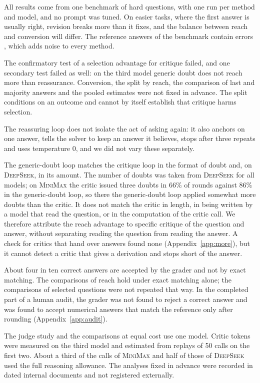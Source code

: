 \documentclass[11pt]{article}
\newcommand{\ds}{\textsc{DeepSeek}}
\newcommand{\mm}{\textsc{MiniMax}}
\begin{document}
All results come from one benchmark of hard questions, with one run per method and model, and no prompt was tuned.
On easier tasks, where the first answer is usually right, revision breaks more than it fixes, and the balance between reach and conversion will differ.
The reference answers of the benchmark contain errors \citep{zhai2026hleverified}, which adds noise to every method.

The confirmatory test of a selection advantage for critique failed, and one secondary test failed as well: on the third model generic doubt does not reach more than reassurance.
Conversion, the split by reach, the comparison of last and majority answers and the pooled estimates were not fixed in advance.
The split conditions on an outcome and cannot by itself establish that critique harms selection.

The reassuring loop does not isolate the act of asking again: it also anchors on one answer, tells the solver to keep an answer it believes, stops after three repeats and uses temperature 0, and we did not vary these separately.

The generic-doubt loop matches the critique loop in the format of doubt and, on \ds, in its amount.
The number of doubts was taken from \ds{} for all models; on \mm{} the critic issued three doubts in 66\% of rounds against 86\% in the generic-doubt loop, so there the generic-doubt loop applied somewhat more doubts than the critic.
It does not match the critic in length, in being written by a model that read the question, or in the computation of the critic call.
We therefore attribute the reach advantage to specific critique of the question and answer, without separating reading the question from reading the answer.
A check for critics that hand over answers found none (Appendix~\ref{app:more}), but it cannot detect a critic that gives a derivation and stops short of the answer.

About four in ten correct answers are accepted by the grader and not by exact matching.
The comparisons of reach hold under exact matching alone; the comparisons of selected questions were not repeated that way.
In the completed part of a human audit, the grader was not found to reject a correct answer and was found to accept numerical answers that match the reference only after rounding (Appendix~\ref{app:audit}).

The judge study and the comparisons at equal cost use one model.
Critic tokens were measured on the third model and estimated from replays of 50 calls on the first two.
About a third of the calls of \mm{} and half of those of \ds{} used the full reasoning allowance.
The analyses fixed in advance were recorded in dated internal documents and not registered externally.
\end{document}
